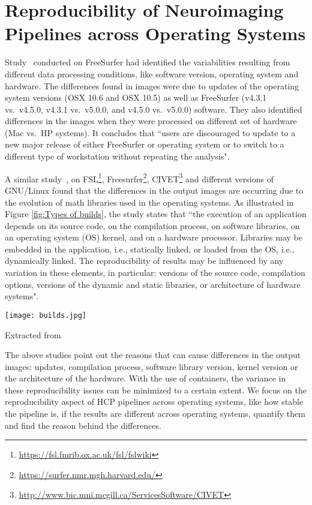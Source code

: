 \section{Reproducibility of Neuroimaging Pipelines across Operating Systems}\label{reproducibility_neuroimaging}

Study~\cite{10.1371/journal.pone.0038234} conducted on FreeSurfer had identified the variabilities resulting from different data processing conditions, like software version, operating system and hardware. The differences found in images were due to updates of the operating system versions (OSX 10.6 and OSX 10.5) as well as FreeSurfer (v4.3.1 vs.\ v4.5.0, v4.3.1 vs.\ v5.0.0, and v4.5.0 vs.\ v5.0.0) software. They also identified differences in the images when they were processed on different set of hardware (Mac vs.\ HP systems). It concludes that ``users are discouraged to update to a new major release of either FreeSurfer or operating system or to switch to a different type of workstation without repeating the analysis".

A similar study~\cite{Gla15}, on FSL\footnote{\url{https://fsl.fmrib.ox.ac.uk/fsl/fslwiki}}, Freesurfer\footnote{\url{https://surfer.nmr.mgh.harvard.edu/}}, CIVET\footnote{\url{http://www.bic.mni.mcgill.ca/ServicesSoftware/CIVET}} and different versions of GNU/Linux found that the differences in the output images are occurring due to the evolution of math libraries used in the operating systems. As illustrated in Figure \ref{fig:Types of builds}, the study states that ``the execution of an application depends on its source code, on the compilation process, on software libraries, on an operating system (OS) kernel, and on a hardware processor. Libraries may be embedded in the application, i.e., statically linked, or loaded from the OS, i.e., dynamically linked. The reproducibility of results may be influenced by any variation in these elements, in particular: versions of the source code, compilation options, versions of the dynamic and static libraries, or architecture of hardware systems".

\begin{center}
\texttt{[image: builds.jpg]}
\label{fig:Types of builds}
\caption*{Extracted from \cite{Gla15}}
\end{center}

The above studies point out the reasons that can cause differences in the output images: updates, compilation process, software library version, kernel version or the architecture of the hardware. With the use of containers, the variance in these reproducibility issues can be minimized to a certain extent. We focus on the reproducibility aspect of HCP pipelines across operating systems, like how stable the pipeline is, if the results are different across operating systems, quantify them and find the reason behind the differences.

